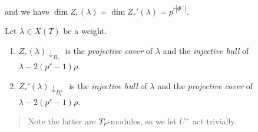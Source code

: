 and we have
\(\dim Z_r(\lambda) = \dim Z_r'(\lambda) = p^{r {\left\lvert {\Phi^+} \right\rvert}}\).

\begin{proposition}[?]

\begin{proposition}[?]

Let \(\lambda\in X(T)\) be a weight.

\begin{enumerate}
\def\labelenumi{\arabic{enumi}.}
\item
  \(Z_r(\lambda)\downarrow_{B_r}\) is the \emph{projective cover} of
  \(\lambda\) and the \emph{injective hull} of
  \(\lambda - 2 (p^r-1) \rho\).
\item
  \(Z_r'(\lambda)\downarrow_{B_r^+}\) is the \emph{injective hull} of
  \(\lambda\) and the \emph{projective cover} of
  \(\lambda - 2 (p^r-1) \rho\).
\end{enumerate}

\end{proposition}

\end{proposition}

\begin{quote}
Note the latter are \(T_r{\hbox{-}}\)modules, so we let \(U^+\) act
trivially.
\end{quote}

